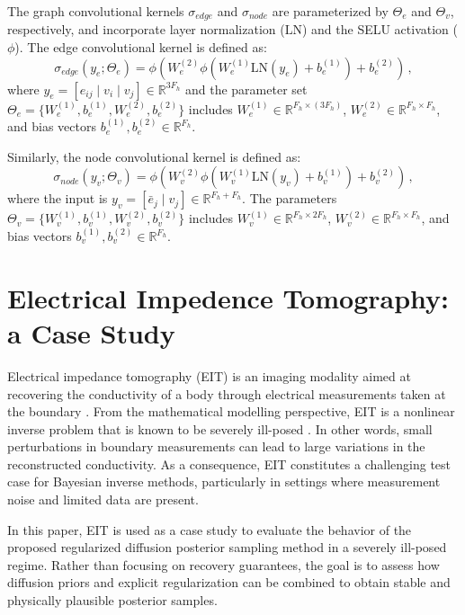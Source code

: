 \documentclass[a4paper,11pt]{article}
\theoremstyle{definition}
\theoremstyle{plain}
\theoremstyle{remark}
\begin{document}
The graph convolutional kernels $\sigma_{edge}$ and $\sigma_{node}$ are parameterized by $\Theta_e$ and $\Theta_v$, respectively, and incorporate layer normalization ($\text{LN}$) and the SELU activation ($\phi$). The edge convolutional kernel is defined as:
\begin{equation}
\sigma_{edge}(y_e ; \Theta_e) = \phi \left(W_{e}^{(2)} \phi \left( W_{e}^{(1)} \text{LN}(y_e) + b_{e}^{(1)} \right) + b_{e}^{(2)}\right) \, ,
\end{equation}
where $y_e = [e_{ij} \mid v_i \mid v_j] \in \mathbb{R}^{3 F_h}$ and the parameter set $\Theta_e = \{W_{e}^{(1)}, b_{e}^{(1)}, W_{e}^{(2)}, b_{e}^{(2)}\}$ includes
$W_{e}^{(1)} \in \mathbb{R}^{F_h \times (3 F_h)}$,   $W_{e}^{(2)} \in \mathbb{R}^{F_h \times F_h}$, and bias vectors $b_{e}^{(1)}, b_{e}^{(2)} \in \mathbb{R}^{F_h}$.

Similarly, the node convolutional kernel is defined as:
\begin{equation}
\sigma_{node}(y_v ; \Theta_v) = \phi \left(W_{v}^{(2)} \phi \left( W_{v}^{(1)} \text{LN}(y_v) + b_{v}^{(1)} \right) + b_{v}^{(2)}\right) \, , 
\end{equation}
where the input is $y_v = [\bar{e}_j \mid v_j]\in \mathbb{R}^{F_h + F_h}$. The parameters $\Theta_v = \{W_{v}^{(1)}, b_{v}^{(1)}, W_{v}^{(2)}, b_{v}^{(2)}\}$ includes $W_{v}^{(1)} \in \mathbb{R}^{F_h \times 2F_h}$, $W_{v}^{(2)} \in \mathbb{R}^{F_h \times F_h}$, and bias vectors $b_{v}^{(1)}, b_{v}^{(2)} \in \mathbb{R}^{F_h}$.

\section{Electrical Impedence Tomography: a Case Study}\label{sec:eit}
Electrical impedance tomography (EIT) is an imaging modality aimed at recovering the conductivity of a body through electrical measurements taken at the boundary \cite{cheney-isaacson-newell-1999,borcea-2002}. From the mathematical modelling perspective, EIT is a nonlinear inverse problem that is known
to be severely ill-posed \cite{alessandrini,mandache}.
In other words, small perturbations in boundary measurements can lead to large variations in the
reconstructed conductivity.
As a consequence, EIT constitutes a challenging test case for Bayesian inverse
methods, particularly in settings where measurement noise and limited data are
present.

In this paper, EIT is used as a case study to evaluate the behavior of the proposed regularized diffusion
posterior sampling method in a severely ill-posed regime.
Rather than focusing on recovery guarantees, the goal is to assess how diffusion
priors and explicit regularization can be combined to obtain stable and physically
plausible posterior samples.
\end{document}
